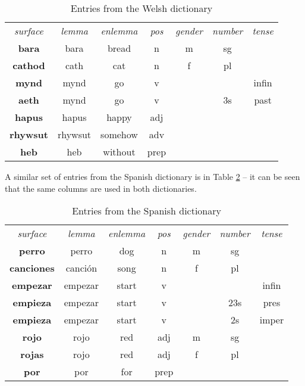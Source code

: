 \documentclass[11pt]{article}
\begin{document}
\begin{table}[!hbtp]
\centering
\begin{scriptsize}
\begin{tabular}{ccccccc}
\textit{surface} & \textit{lemma} & \textit{enlemma} & \textit{pos} & \textit{gender} & \textit{number} & \textit{tense} \\
\textbf{bara} & bara & bread & n & m & sg & \\
\textbf{cathod} & cath & cat & n & f & pl & \\
\textbf{mynd} & mynd & go & v & & & infin \\
\textbf{aeth} & mynd & go & v & & 3s & past \\
\textbf{hapus} & hapus & happy & adj & &  & \\
\textbf{rhywsut} & rhywsut & somehow & adv & & & \\
\textbf{heb} & heb & without & prep & & & \\
\end{tabular}
\end{scriptsize}
\caption{Entries from the Welsh dictionary}
\label{welsh_dict}
\end{table}

A similar set of entries from the Spanish dictionary is in Table \ref{spanish_dict} -- it can be seen that the same columns are used in both dictionaries.

\begin{table}[!hbtp]
\centering
\begin{scriptsize}
\begin{tabular}{ccccccc}
\textit{surface} & \textit{lemma} & \textit{enlemma} & \textit{pos} & \textit{gender} & \textit{number} & \textit{tense} \\
\textbf{perro} & perro & dog & n & m & sg & \\
\textbf{canciones} & canción & song & n & f & pl & \\
\textbf{empezar} & empezar & start & v & & & infin \\
\textbf{empieza} & empezar & start & v & & 23s & pres \\
\textbf{empieza} & empezar & start & v & & 2s & imper \\
\textbf{rojo} & rojo & red & adj & m & sg & \\
\textbf{rojas} & rojo & red & adj & f & pl & \\
\textbf{por} & por & for & prep & & & \\
\end{tabular}
\end{scriptsize}
\caption{Entries from the Spanish dictionary}
\label{spanish_dict}
\end{table}
\end{document}
